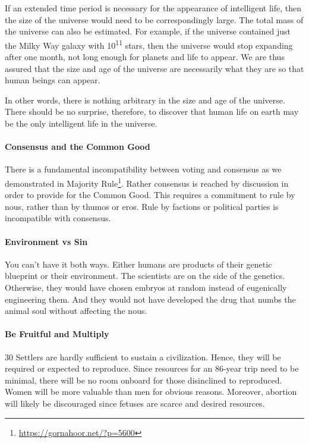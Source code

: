 If an extended time period is necessary for the appearance of intelligent life, then the size of the universe would need to be correspondingly large. The total mass of the universe can also be estimated. For example, if the universe contained just the Milky Way galaxy with 10\textsuperscript{11} stars, then the universe would stop expanding after one month, not long enough for planets and life to appear. We are thus assured that the size and age of the universe are necessarily what they are so that human beings can appear.

In other words, there is nothing arbitrary in the size and age of the universe. There should be no surprise, therefore, to discover that human life on earth may be the only intelligent life in the universe.

\paragraph{Consensus and the Common Good}


There is a fundamental incompatibility between voting and consensus as we demonstrated in Majority Rule\footnote{\url{https://gornahoor.net/?p=5600}}. Rather consensus is reached by discussion in order to provide for the Common Good. This requires a commitment to rule by nous, rather than by thumos or eros. Rule by factions or political parties is incompatible with consensus.

\paragraph{Environment vs Sin}

You can't have it both ways. Either humans are products of their genetic blueprint or their environment. The scientists are on the side of the genetics. Otherwise, they would have chosen embryos at random instead of eugenically engineering them. And they would not have developed the drug that numbs the animal soul without affecting the nous.

\paragraph{Be Fruitful and Multiply}


30 Settlers are hardly sufficient to sustain a civilization. Hence, they will be required or expected to reproduce. Since resources for an 86-year trip need to be minimal, there will be no room onboard for those disinclined to reproduced. Women will be more valuable than men for obvious reasons. Moreover, abortion will likely be discouraged since fetuses are scarce and desired resources.

